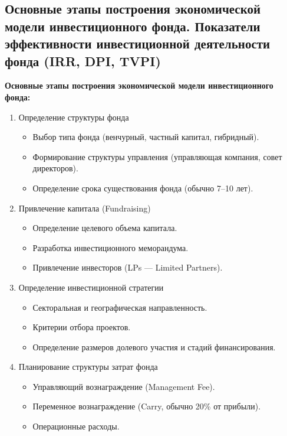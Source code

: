 \pagebreak
\subsection{Основные этапы построения экономической модели инвестиционного фонда. Показатели эффективности инвестиционной деятельности фонда (IRR, DPI, TVPI)}

\textbf{Основные этапы построения экономической модели инвестиционного фонда:}
\begin{enumerate}
    \item Определение структуры фонда
        \begin{itemize}
            \item Выбор типа фонда (венчурный, частный капитал, гибридный).
            \item Формирование структуры управления (управляющая компания, совет директоров).
            \item Определение срока существования фонда (обычно 7–10 лет).
        \end{itemize}
    \item Привлечение капитала (Fundraising)
        \begin{itemize}
            \item Определение целевого объема капитала.
            \item Разработка инвестиционного меморандума.
            \item Привлечение инвесторов (LPs --- Limited Partners).
        \end{itemize}
    \item Определение инвестиционной стратегии
        \begin{itemize}
            \item Секторальная и географическая направленность.
            \item Критерии отбора проектов.
            \item Определение размеров долевого участия и стадий финансирования.
        \end{itemize}
    \item Планирование структуры затрат фонда
        \begin{itemize}
            \item Управляющий вознаграждение (Management Fee).
            \item Переменное вознаграждение (Carry, обычно 20\% от прибыли).
            \item Операционные расходы.
        \end{itemize}

\end{enumerate}
